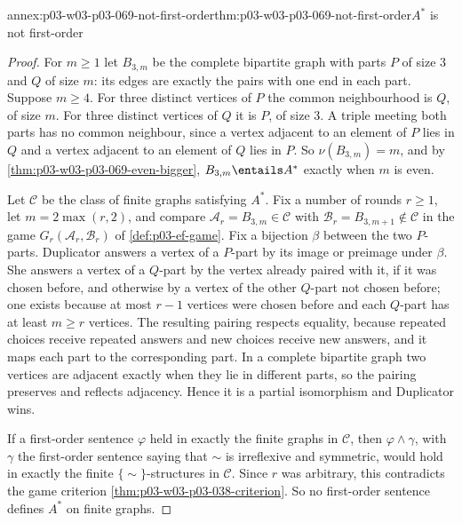 \begin{annexitem}{annex:p03-w03-p03-069-not-first-order}{thm:p03-w03-p03-069-not-first-order}{\(A^*\) is not first-order}
\begin{proof}
For \(m\geq1\) let \(B_{3,m}\) be the complete bipartite graph with parts
\(P\) of size \(3\) and \(Q\) of size \(m\): its edges are exactly the pairs
with one end in each part.  Suppose \(m\geq4\).  For three distinct vertices
of \(P\) the common neighbourhood is \(Q\), of size \(m\).  For three
distinct vertices of \(Q\) it is \(P\), of size \(3\).  A triple meeting both
parts has no common neighbour, since a vertex adjacent to an element of \(P\)
lies in \(Q\) and a vertex adjacent to an element of \(Q\) lies in \(P\).  So
\(\nu(B_{3,m})=m\), and by \cref{thm:p03-w03-p03-069-even-bigger},
\(B_{3,m}\entails A^*\) exactly when \(m\) is even.

Let \(\mathcal C\) be the class of finite graphs satisfying \(A^*\).  Fix a
number of rounds \(r\geq1\), let \(m=2\max(r,2)\), and compare
\(\mathcal A_r=B_{3,m}\in\mathcal C\) with
\(\mathcal B_r=B_{3,m+1}\notin\mathcal C\) in the game
\(G_r(\mathcal A_r,\mathcal B_r)\) of \cref{def:p03-ef-game}.  Fix a
bijection \(\beta\) between the two \(P\)-parts.  Duplicator answers a vertex
of a \(P\)-part by its image or preimage under \(\beta\).  She answers a vertex
of a \(Q\)-part by the vertex already paired with it, if it was chosen before,
and otherwise by a vertex of the other \(Q\)-part not chosen before; one
exists because at most \(r-1\) vertices were chosen before and each
\(Q\)-part has at least \(m\geq r\) vertices.  The resulting pairing respects
equality, because repeated choices receive repeated answers and new choices
receive new answers, and it maps each part to the corresponding part.  In a
complete bipartite graph two vertices are adjacent exactly when they lie in
different parts, so the pairing preserves and reflects adjacency.  Hence it
is a partial isomorphism and Duplicator wins.

If a first-order sentence \(\varphi\) held in exactly the finite graphs in
\(\mathcal C\), then \(\varphi\wedge\gamma\), with \(\gamma\) the
first-order sentence saying that \(\sim\) is irreflexive and symmetric, would
hold in exactly the finite \(\{\sim\}\)-structures in \(\mathcal C\).  Since
\(r\) was arbitrary, this contradicts the game criterion
\cref{thm:p03-w03-p03-038-criterion}.  So no first-order sentence defines
\(A^*\) on finite graphs.


\end{proof}
\end{annexitem}
